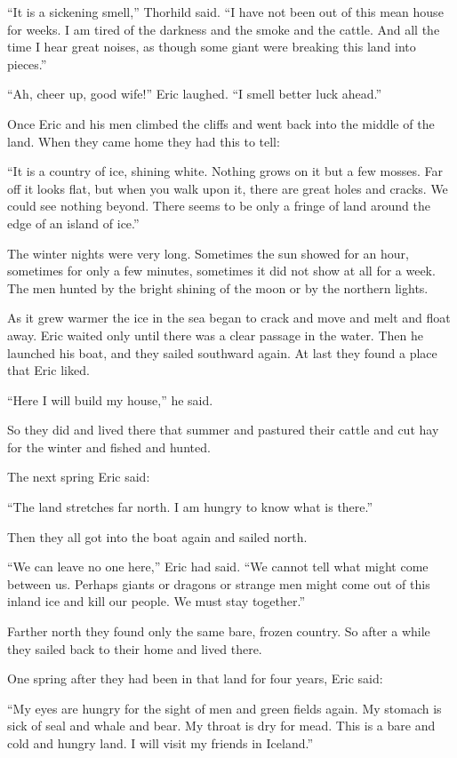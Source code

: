 ``It is a sickening smell,'' Thorhild said. ``I have not been out of
this mean house for weeks. I am tired of the darkness and the smoke and
the cattle. And all the time I hear great noises, as though some giant
were breaking this land into pieces.''

``Ah, cheer up, good wife!'' Eric laughed. ``I smell better luck
ahead.''

Once Eric and his men climbed the cliffs and went back into the middle
of the land. When they came home they had this to tell:

``It is a country of ice, shining white. Nothing grows on it but a few
mosses. Far off it looks flat, but when you walk upon it, there are
great holes and cracks. We could see nothing beyond. There seems to be
only a fringe of land around the edge of an island of ice.''

The winter nights were very long. Sometimes the sun showed for an hour,
sometimes for only a few minutes, sometimes it did not show at all for a
week. The men hunted by the bright shining of the moon or by the
northern lights.

As it grew warmer the ice in the sea began to crack and move and melt
and float away. Eric waited only until there was a clear passage in the
water. Then he launched his boat, and they sailed southward again. At
last they found a place that Eric liked.

``Here I will build my house,'' he said.

So they did and lived there that summer and pastured their cattle and
cut hay for the winter and fished and hunted.

The next spring Eric said:

``The land stretches far north. I am hungry to know what is there.''

Then they all got into the boat again and sailed north.

``We can leave no one here,'' Eric had said. ``We cannot tell what might
come between us. Perhaps giants or dragons or strange men might come out
of this inland ice and kill our people. We must stay together.''

Farther north they found only the same bare, frozen country. So after a
while they sailed back to their home and lived there.

One spring after they had been in that land for four years, Eric said:

``My eyes are hungry for the sight of men and green fields again. My
stomach is sick of seal and whale and bear. My throat is dry for mead.
This is a bare and cold and hungry land. I will visit my friends in
Iceland.''

